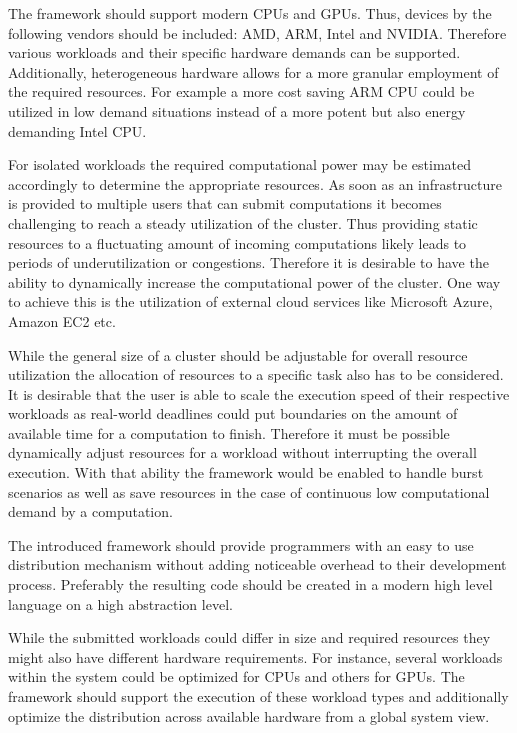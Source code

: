 \begin{description}[style=nextline]
    \item [Heterogeneity]
    The framework should support modern CPUs and GPUs. Thus, devices by the following vendors should be included: AMD, ARM, Intel and NVIDIA. Therefore various workloads and their specific hardware demands can be supported. Additionally, heterogeneous hardware allows for a more granular employment of the required resources. For example a more cost saving ARM CPU could be utilized in low demand situations instead of a more potent but also energy demanding Intel CPU.

    \item [Resource Scalability]
    For isolated workloads the required computational power may be estimated accordingly to determine the appropriate resources. As soon as an infrastructure is provided to multiple users that can submit computations it becomes challenging to reach a steady utilization of the cluster. Thus providing static resources to a fluctuating amount of incoming computations likely leads to periods of underutilization or congestions. Therefore it is desirable to have the ability to dynamically increase the computational power of the cluster. One way to achieve this is the utilization of external cloud services like Microsoft Azure, Amazon EC2 etc.

    \item [Scalable Speed]
    While the general size of a cluster should be adjustable for overall resource utilization the allocation of resources to a specific task also has to be considered. It is desirable that the user is able to scale the execution speed of their respective workloads as real-world deadlines could put boundaries on the amount of available time for a computation to finish. Therefore it must be possible dynamically adjust resources for a workload without interrupting the overall execution. With that ability the framework would be enabled to handle burst scenarios as well as save resources in the case of continuous low computational demand by a computation.

    \item [Ease of Programming]
    The introduced framework should provide programmers with an easy to use distribution mechanism without adding noticeable overhead to their development process. Preferably the resulting code should be created in a modern high level language on a high abstraction level.

    \item [Workload Diversity]
    While the submitted workloads could differ in size and required resources they might also have different hardware requirements. For instance, several workloads within the system could be optimized for CPUs and others for GPUs. The framework should support the execution of these workload types and additionally optimize the distribution across available hardware from a global system view.


\end{description}
